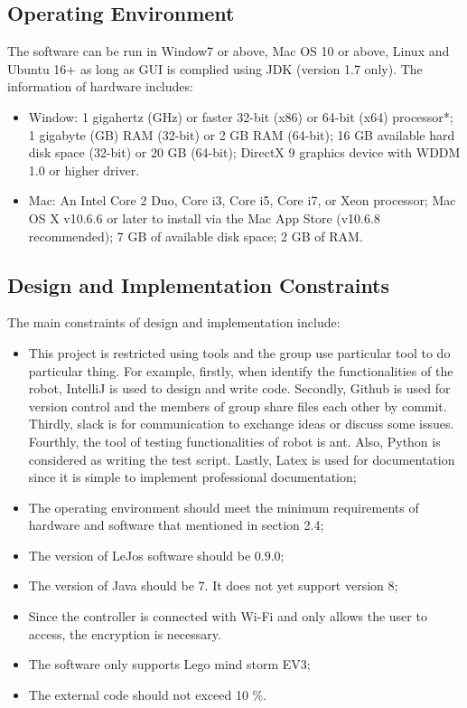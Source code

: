 \documentclass[10pt,a4paper,titlepage]{article}
\begin{document}
\subsection{Operating Environment}
The software can be run in Window7 or above, Mac OS 10 or above, Linux and Ubuntu 16+ as long as GUI is complied using JDK (version 1.7 only). The information of hardware includes:
\begin{itemize}
	\item Window: 1 gigahertz (GHz) or faster 32-bit (x86) or 64-bit (x64) processor*;
	1 gigabyte (GB) RAM (32-bit) or 2 GB RAM (64-bit);
	16 GB available hard disk space (32-bit) or 20 GB (64-bit);
	DirectX 9 graphics device with WDDM 1.0 or higher driver.
	\item Mac: An Intel Core 2 Duo, Core i3, Core i5, Core i7, or Xeon processor;
	Mac OS X v10.6.6 or later to install via the Mac App Store (v10.6.8 recommended);
	7 GB of available disk space;
	2 GB of RAM.
\end{itemize}

\subsection{Design and Implementation Constraints}
The main constraints of design and implementation include:
\begin{itemize}
	
	\item This project is restricted using tools and the group use particular tool to do particular thing. For example, firstly, when identify the functionalities of the robot, IntelliJ is used to design and write code. Secondly, Github is used for version control and the members of group share files each other by commit. Thirdly, slack is for communication to exchange ideas or discuss some issues. Fourthly, the tool of testing functionalities of robot is ant. Also, Python is considered as writing the test script. Lastly, Latex is used for documentation since it is simple to implement professional documentation;
	\item The operating environment should meet the minimum requirements of hardware and software that mentioned in section 2.4;
	\item The version of LeJos software should be 0.9.0;
	\item The version of Java should be 7. It does not yet support version 8;
	\item Since the controller is connected with Wi-Fi and only allows the user to access, the encryption is necessary.
	\item The software only supports Lego mind storm EV3;
	\item The external code should not exceed 10 \%.
\end{itemize}
\end{document}
